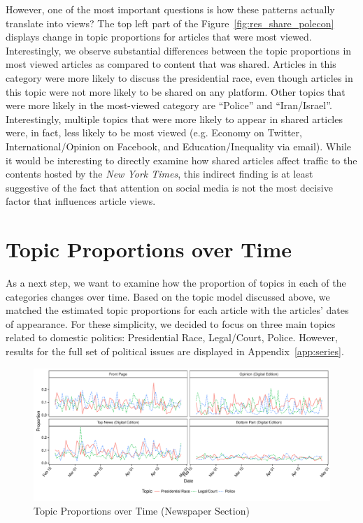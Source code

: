 \documentclass[12pt]{article}
\begin{document}
\begin{doublespace}
However, one of the most important questions is how these patterns actually translate into views? The top left part of the Figure~\ref{fig:res_share_polecon} displays change in topic proportions for articles that were most viewed. Interestingly, we observe substantial differences between the topic proportions in most viewed articles as compared to content that was shared. Articles in this category were more likely to discuss the presidential race, even though articles in this topic were not more likely to be shared on any platform. Other topics that were more likely in the most-viewed category are ``Police'' and ``Iran/Israel''. Interestingly, multiple topics that were more likely to appear in shared articles were, in fact, less likely to be most viewed (e.g. Economy on Twitter, International/Opinion on Facebook, and Education/Inequality via email). While it would be interesting to directly examine how shared articles affect traffic to the contents hosted by the \textit{New York Times}, this indirect finding is at least suggestive of the fact that attention on social media is not the most decisive factor that influences article views.


\section{Topic Proportions over Time}

As a next step, we want to examine how the proportion of topics in each of the categories changes over time. Based on the topic model discussed above, we matched the estimated topic proportions for each article with the articles' dates of appearance. For these simplicity, we decided to focus on three main topics related to domestic politics: Presidential Race, Legal/Court, Police. However, results for the full set of political issues are displayed in Appendix~\ref{app:series}.

\begin{figure}
\caption{Topic Proportions over Time (Newspaper Section)}\label{fig:series_nyt_main}
\includegraphics[width=\textwidth]{../calc/fig/series_nyt_main} 
\end{figure}


\end{doublespace}
\end{document}
